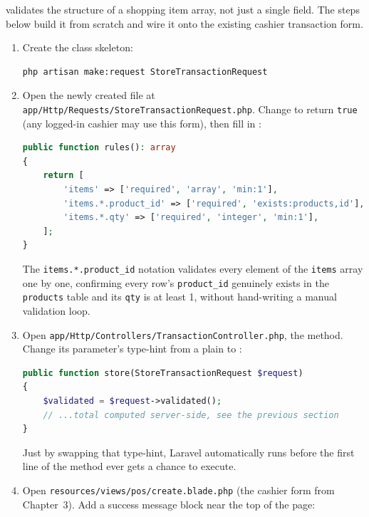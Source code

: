  validates the structure of a shopping
item array, not just a single field. The steps below build it from
scratch and wire it onto the existing cashier transaction form.

\begin{enumerate}
  \item Create the  class skeleton:
    \begin{lstlisting}[language=bash]
php artisan make:request StoreTransactionRequest
    \end{lstlisting}
  \item Open the newly created file at
    \texttt{app/Http\allowbreak/Requests\allowbreak/StoreTransactionRequest.php}. Change
     to return \texttt{true} (any logged-in cashier
    may use this form), then fill in :
    \begin{lstlisting}[language=php, title=\lstfile{app/Http/Requests/StoreTransactionRequest.php}]
public function rules(): array
{
    return [
        'items' => ['required', 'array', 'min:1'],
        'items.*.product_id' => ['required', 'exists:products,id'],
        'items.*.qty' => ['required', 'integer', 'min:1'],
    ];
}
    \end{lstlisting}
    The \texttt{items.*.product\_id} notation validates every element
    of the \texttt{items} array one by one, confirming every row's
    \texttt{product\_id} genuinely exists in the \texttt{products}
    table and its \texttt{qty} is at least 1, without hand-writing a
    manual validation loop.
  \item Open \texttt{app/Http/Controllers/TransactionController.php},
    the  method. Change its parameter's type-hint from a
    plain  to :
    \begin{lstlisting}[language=php, title=\lstfile{app/Http/Controllers/TransactionController.php}]
public function store(StoreTransactionRequest $request)
{
    $validated = $request->validated();
    // ...total computed server-side, see the previous section
}
    \end{lstlisting}
    Just by swapping that type-hint, Laravel automatically runs
     before the first line of the  method
    ever gets a chance to execute.
  \item Open \texttt{resources/views/pos/create.blade.php} (the
    cashier form from Chapter~3). Add a success message block near the
    top of the page:
    \begin{lstlisting}[language=php, title=\lstfile{resources/views/pos/create.blade.php}]

\end{lstlisting}
\end{enumerate}
